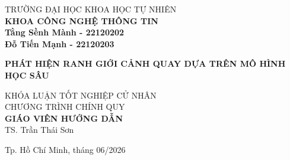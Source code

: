 \thispagestyle{empty}
\begin{titlepage}

\begin{center}
TRƯỜNG ĐẠI HỌC KHOA HỌC TỰ NHIÊN\\
\textbf{KHOA CÔNG NGHỆ THÔNG TIN}\\[2cm]

{\large \bfseries Tằng Sềnh Mành - 22120202\\}
{\large \bfseries Đỗ Tiến Mạnh - 22120203\\[2cm]}

{ \Large \bfseries PHÁT HIỆN RANH GIỚI CẢNH QUAY DỰA TRÊN MÔ HÌNH HỌC SÂU\\[2cm] }

\large KHÓA LUẬN TỐT NGHIỆP CỬ NHÂN\\
\large CHƯƠNG TRÌNH CHÍNH QUY\\[2cm]

\textbf{GIÁO VIÊN HƯỚNG DẪN}\\
TS. Trần Thái Sơn\\


\vfill
Tp. Hồ Chí Minh, tháng 06/2026

\end{center}

\end{titlepage}
